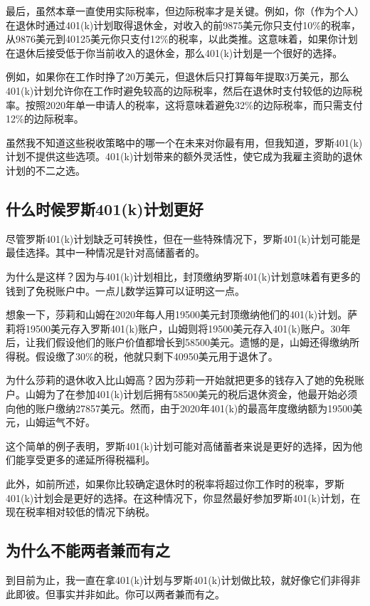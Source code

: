 最后，虽然本章一直使用实际税率，但边际税率才是关键。例如，你（作为个人）在退休时通过401(k)计划取得退休金，对收入的前9875美元你只支付10\%的税率，从9876美元到40125美元你只支付12\%的税率，以此类推。这意味着，如果你计划在退休后接受低于你当前收入的退休金，那么401(k)计划是一个很好的选择。

例如，如果你在工作时挣了20万美元，但退休后只打算每年提取3万美元，那么401(k)计划允许你在工作时避免较高的边际税率，然后在退休时支付较低的边际税率。按照2020年单一申请人的税率，这将意味着避免32\%的边际税率，而只需支付12\%的边际税率。

虽然我不知道这些税收策略中的哪一个在未来对你最有用，但我知道，罗斯401(k)计划不提供这些选项。401(k)计划带来的额外灵活性，使它成为我雇主资助的退休计划的不二之选。

\subsection{什么时候罗斯401(k)计划更好}

尽管罗斯401(k)计划缺乏可转换性，但在一些特殊情况下，罗斯401(k)计划可能是最佳选择。其中一种情况是针对高储蓄者的。

为什么是这样？因为与401(k)计划相比，封顶缴纳罗斯401(k)计划意味着有更多的钱到了免税账户中。一点儿数学运算可以证明这一点。

想象一下，莎莉和山姆在2020年每人用19500美元封顶缴纳他们的401(k)计划。萨莉将19500美元存入罗斯401(k)账户，山姆则将19500美元存入401(k)账户。30年后，让我们假设他们的账户价值都增长到58500美元。遗憾的是，山姆还得缴纳所得税。假设缴了30\%的税，他就只剩下40950美元用于退休了。

为什么莎莉的退休收入比山姆高？因为莎莉一开始就把更多的钱存入了她的免税账户。山姆为了在参加401(k)计划后拥有58500美元的税后退休资金，他最开始必须向他的账户缴纳27857美元。然而，由于2020年401(k)的最高年度缴纳额为19500美元，山姆运气不好。

这个简单的例子表明，罗斯401(k)计划可能对高储蓄者来说是更好的选择，因为他们能享受更多的递延所得税福利。

此外，如前所述，如果你比较确定退休时的税率将超过你工作时的税率，罗斯401(k)计划会是更好的选择。在这种情况下，你显然最好参加罗斯401(k)计划，在现在税率相对较低的情况下纳税。

\subsection{为什么不能两者兼而有之}

到目前为止，我一直在拿401(k)计划与罗斯401(k)计划做比较，就好像它们非得非此即彼。但事实并非如此。你可以两者兼而有之。

